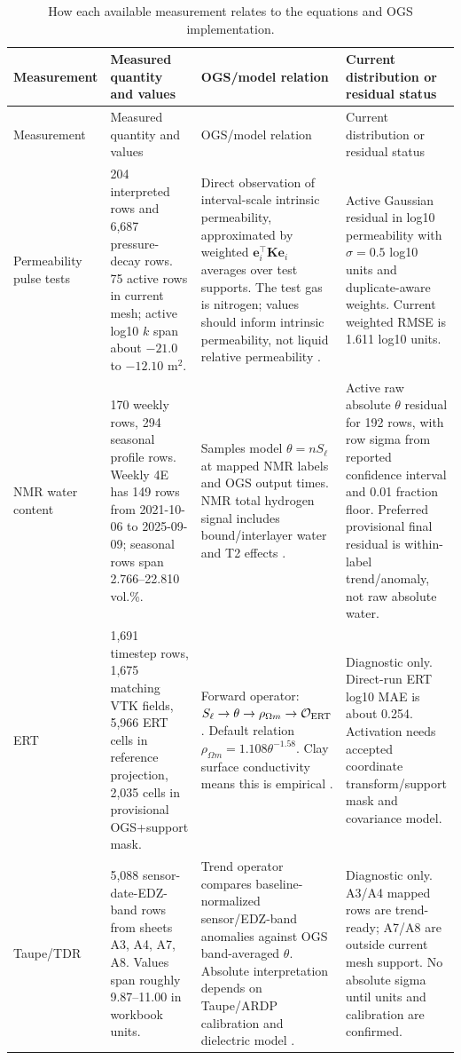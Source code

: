 \documentclass[10pt,a4paper]{article}
\newcommand{\npor}{n}
\newcommand{\Sat}{S_\ell}
\newcommand{\K}{\bm K}
\newcommand{\thetaw}{\theta}
\newcommand{\Oop}{\mathcal O}
\begin{document}
\begin{longtable}{@{}L{0.18\textwidth}L{0.18\textwidth}L{0.21\textwidth}Y@{}}
\caption{How each available measurement relates to the equations and OGS implementation.}\\
\toprule
Measurement & Measured quantity and values & OGS/model relation & Current distribution or residual status \\
\midrule
\endfirsthead
\toprule
Measurement & Measured quantity and values & OGS/model relation & Current distribution or residual status \\
\midrule
\endhead
\bottomrule
\endlastfoot
Permeability pulse tests & 204 interpreted rows and 6,687 pressure-decay rows.  75 active rows in current mesh; active log10 \(k\) span about \(-21.0\) to \(-12.10\) \(\mathrm{m^2}\). & Direct observation of interval-scale intrinsic permeability, approximated by weighted \( \bm e_i^\top\K\bm e_i\) averages over test supports.  The test gas is nitrogen; values should inform intrinsic permeability, not liquid relative permeability \citep{Klinkenberg1941,Marschall2005}. & Active Gaussian residual in log10 permeability with \(\sigma=0.5\) log10 units and duplicate-aware weights.  Current weighted RMSE is 1.611 log10 units. \\
NMR water content & 170 weekly rows, 294 seasonal profile rows.  Weekly 4E has 149 rows from 2021-10-06 to 2025-09-09; seasonal rows span 2.766--22.810 vol.\%. & Samples model \(\thetaw=\npor\Sat\) at mapped NMR labels and OGS output times.  NMR total hydrogen signal includes bound/interlayer water and T2 effects \citep{Kleinberg1996NMR,Cui2022DualScaleNMR}. & Active raw absolute \(\theta\) residual for 192 rows, with row sigma from reported confidence interval and 0.01 fraction floor.  Preferred provisional final residual is within-label trend/anomaly, not raw absolute water. \\
ERT & 1,691 timestep rows, 1,675 matching VTK fields, 5,966 ERT cells in reference projection, 2,035 cells in provisional OGS+support mask. & Forward operator: \(\Sat\rightarrow\thetaw\rightarrow\rho_{\Omega m}\rightarrow\Oop_{\rm ERT}\).  Default relation \(\rho_{\Omega m}=1.108\theta^{-1.58}\).  Clay surface conductivity means this is empirical \citep{Archie1942,Revil1998ShalySands}. & Diagnostic only.  Direct-run ERT log10 MAE is about 0.254.  Activation needs accepted coordinate transform/support mask and covariance model. \\
Taupe/TDR & 5,088 sensor-date-EDZ-band rows from sheets A3, A4, A7, A8.  Values span roughly 9.87--11.00 in workbook units. & Trend operator compares baseline-normalized sensor/EDZ-band anomalies against OGS band-averaged \(\thetaw\).  Absolute interpretation depends on Taupe/ARDP calibration and dielectric model \citep{Topp1980TDR,Robinson2003TDRReview,TaupeISU2026Local}. & Diagnostic only.  A3/A4 mapped rows are trend-ready; A7/A8 are outside current mesh support.  No absolute sigma until units and calibration are confirmed. \\

\end{longtable}
\end{document}
